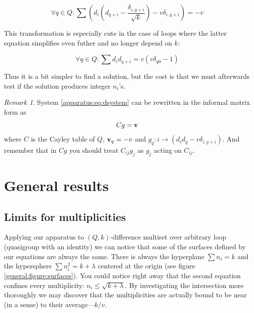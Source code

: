 \documentclass{article}
\theoremstyle{plain}
\theoremstyle{definition}
\theoremstyle{remark}
\newtheorem{remark}[theorem]{Remark}
\begin{document}
		\begin{equation}
			\label{apparatus:eq:dsystem_general}
			\forall q \in Q \colon \sum (d_i (d_{q+i}-\frac{\delta_{i,q+i}}{\sqrt k})-v\delta_{i,q+i}) = -v
		\end{equation}
		
		This transformation is especially cute in the case of loops where the latter equation simplifies even futher and no longer depend on $k$:
		
		\begin{equation}
			\label{apparatus:eq:dsystem}
			\forall q \in Q \colon \sum d_i d_{q+i} = v (v \delta_{q0}-1)
		\end{equation}
		
		Thus it is a bit simpler to find a solution, but the cost is that we must afterwards test if the solution produces integer $n_i$'s.
		
		\begin{remark}
            System \eqref{apparatus:eq:dsystem} can be rewritten in the informal matrix form as
            \begin{equation}
                \label{apparatus:eq:dmatrixform}
                Cg=\bf v
            \end{equation}
            where $C$ is the Cayley table of $Q$, ${\bf v}_q = -v$ and $g_q: i \rightarrow (d_i d_q -v\delta_{i,q+i})$. And remember that in $Cg$ you should treat $C_{ij}g_j$ as $g_j$ acting on $C_{ij}$.
		\end{remark}
		
    \section{General results}
        \subsection{Limits for multiplicities}
            Applying our apparatus to $(Q,k)$-difference multiset over arbitrary loop (quasigroup with an identity) we can notice that some of the surfaces defined by our equations are always the same. There is always the hyperplane $\sum {n_i} = k$ and the hypersphere $\sum n_i^2 = k + \lambda$ centered at the origin (see figure \ref{general:figure:surfaces}). You could notice right away that the second equation confines every multiplicity: $n_i \leq \sqrt{k+\lambda}$. By investigating the intersection more thoroughly we may discover that the multiplicities are actually bound to be near (in a sense) to their average---$k/v$.
\end{document}
